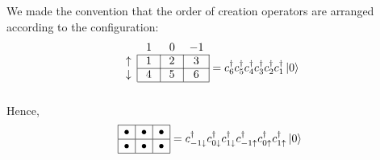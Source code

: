 We made the convention that the order of creation operators are arranged
according to the configuration:
\begin{equation}
\begin{array}{c|c|c|c|}
\multicolumn{1}{c}{} & \multicolumn{1}{c}{\phantom{,}1\phantom{,}} & \multicolumn{1}{c}{\phantom{,}0\phantom{,}} & \multicolumn{1}{c}{-1} \\ \cline{2-4}
\uparrow & 1 & 2 & 3 \\ \cline{2-4}
\downarrow & 4 & 5 & 6 \\
\cline{2-4}
\multicolumn{1}{c}{}
\end{array} =
c_6^\dagger c_5^\dagger c_4^\dagger
c_3^\dagger c_2^\dagger c_1^\dagger
\Ket{0}
\end{equation}
%
Hence,
\begin{equation} \label{eq:createorder}
\begin{array}{|c|c|c|}
\hline
\bullet & \bullet & \bullet \\ \hline
\bullet & \bullet & \bullet \\
\hline
\end{array} =
c_{-1\downarrow}^\dagger c_{0\downarrow}^\dagger c_{1\downarrow}^\dagger
c_{-1\uparrow}^\dagger c_{0\uparrow}^\dagger c_{1\uparrow}^\dagger
\Ket{0}
\end{equation}

